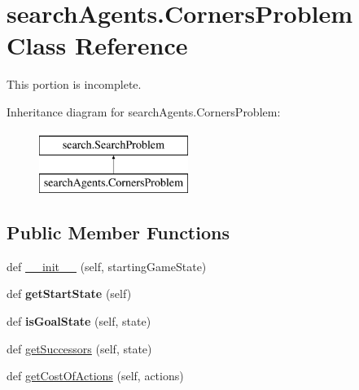 \hypertarget{classsearch_agents_1_1_corners_problem}{}\section{search\+Agents.\+Corners\+Problem Class Reference}
\label{classsearch_agents_1_1_corners_problem}


This portion is incomplete.  


Inheritance diagram for search\+Agents.\+Corners\+Problem\+:\begin{figure}[H]
\begin{center}
\leavevmode
\includegraphics[height=2.000000cm]{classsearch_agents_1_1_corners_problem}
\end{center}
\end{figure}
\subsection*{Public Member Functions}
\begin{DoxyCompactItemize}
\item 
def \hyperlink{classsearch_agents_1_1_corners_problem_a8f0a2bae690d6d0ee6ddb6515ef477d9}{\+\_\+\+\_\+init\+\_\+\+\_\+} (self, starting\+Game\+State)
\item 
\mbox{\label{classsearch_agents_1_1_corners_problem_a977edf899a044c6c6dfb10912511c111}} 
def {\bfseries get\+Start\+State} (self)
\item 
\mbox{\label{classsearch_agents_1_1_corners_problem_a73266786a18f9064a72dacbca62d88f5}} 
def {\bfseries is\+Goal\+State} (self, state)
\item 
def \hyperlink{classsearch_agents_1_1_corners_problem_a9f612b359d4cd90ff87759c4ade8fbab}{get\+Successors} (self, state)
\item 
def \hyperlink{classsearch_agents_1_1_corners_problem_a0530021a28c4f2e26866761ece75cec8}{get\+Cost\+Of\+Actions} (self, actions)
\end{DoxyCompactItemize}
